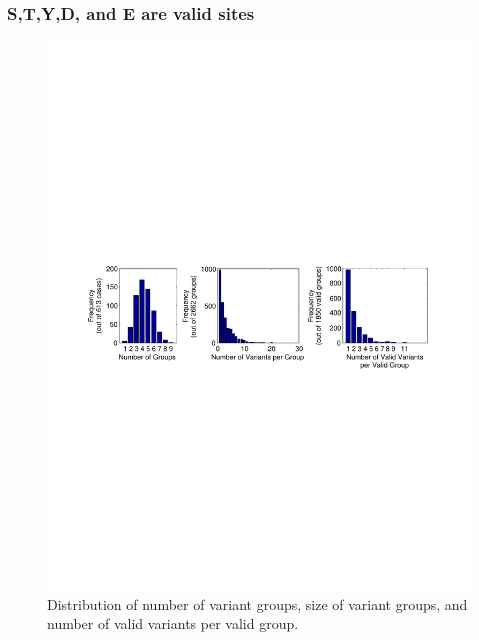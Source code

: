 \subsubsection{S,T,Y,D, and E are valid sites}
\begin{figure}[htbp]
\centering %
\includegraphics[trim = 2mm 105mm 4mm 105mm,
clip,width=\textwidth]{fig/phospho/uniqueIds/size_dist_uniq_by_STYDE.pdf}
\caption{Distribution of number of variant groups, size of variant groups, and number of valid variants per valid group.}
\label{fig:yeast_sizedist_STYDE}
\end{figure}

